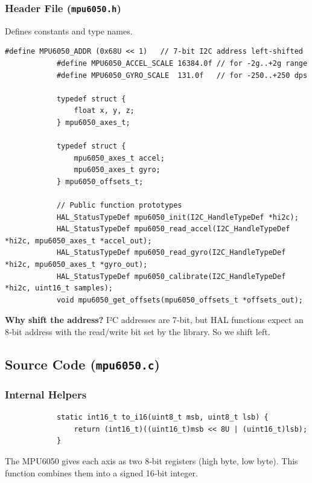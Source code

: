 \documentclass[12pt,a4paper]{article}
\begin{document}
		\subsubsection{Header File (\texttt{mpu6050.h})}
		Defines constants and type names.
		
		\begin{lstlisting}[caption={mpu6050.h (key parts)}]
			#define MPU6050_ADDR (0x68U << 1)   // 7‑bit I2C address left‑shifted
			#define MPU6050_ACCEL_SCALE 16384.0f // for ‑2g..+2g range
			#define MPU6050_GYRO_SCALE  131.0f   // for ‑250..+250 dps
			
			typedef struct {
				float x, y, z;
			} mpu6050_axes_t;
			
			typedef struct {
				mpu6050_axes_t accel;
				mpu6050_axes_t gyro;
			} mpu6050_offsets_t;
			
			// Public function prototypes
			HAL_StatusTypeDef mpu6050_init(I2C_HandleTypeDef *hi2c);
			HAL_StatusTypeDef mpu6050_read_accel(I2C_HandleTypeDef *hi2c, mpu6050_axes_t *accel_out);
			HAL_StatusTypeDef mpu6050_read_gyro(I2C_HandleTypeDef *hi2c, mpu6050_axes_t *gyro_out);
			HAL_StatusTypeDef mpu6050_calibrate(I2C_HandleTypeDef *hi2c, uint16_t samples);
			void mpu6050_get_offsets(mpu6050_offsets_t *offsets_out);
		\end{lstlisting}
		
		\textbf{Why shift the address?} I²C addresses are 7‑bit, but HAL functions expect an 8‑bit address with the read/write bit set by the library. So we shift left.
		
		\subsection{Source Code (\texttt{mpu6050.c})}
		\subsubsection{Internal Helpers}
		\begin{lstlisting}
			static int16_t to_i16(uint8_t msb, uint8_t lsb) {
				return (int16_t)((uint16_t)msb << 8U | (uint16_t)lsb);
			}
		\end{lstlisting}
		The MPU6050 gives each axis as two 8‑bit registers (high byte, low byte). This function combines them into a signed 16‑bit integer.
		
\end{document}
